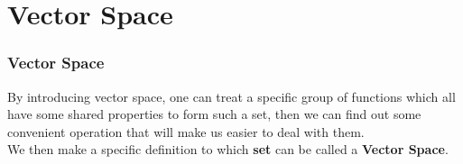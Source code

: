 \documentclass{beamer}
\begin{document}
\section{Vector Space}
\begin{frame}
    \frametitle{Vector Space}

    \hspace{1em}By introducing vector space, one can treat a specific group of functions which all have some shared properties to form such a set, then
    we can find out some convenient operation that will make us easier to deal with them.\\
    \vspace{1em}
    \hspace{1em}
    We then make a specific definition to which \textbf{set} can be called a \textbf{Vector Space}.

\end{frame}
\end{document}
